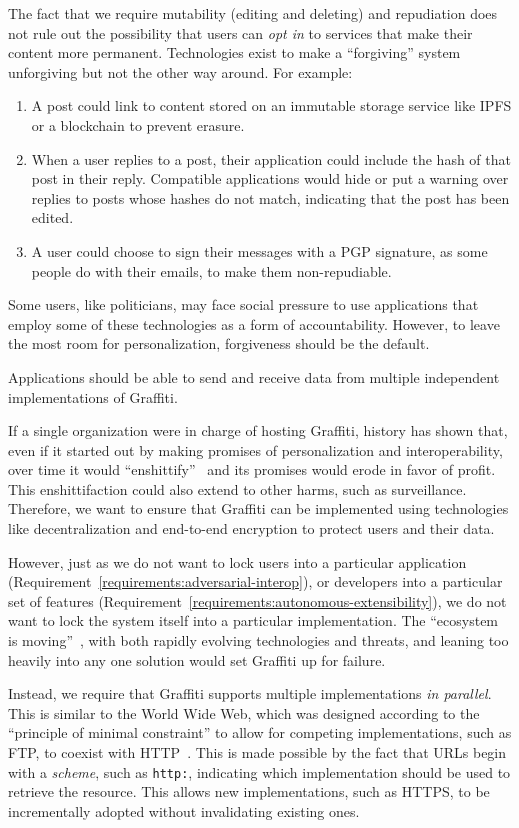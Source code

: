 The fact that we require mutability (editing and deleting) and repudiation does not rule
out the possibility that users can \emph{opt in} to services that make their content more permanent.
Technologies exist to make a ``forgiving'' system unforgiving but not the other way around.
For example:
\begin{enumerate}
\item
A post could link to content stored on an immutable storage service like IPFS
or a blockchain to prevent erasure.
\item
When a user replies to a post, their application could include the hash
of that post in their reply. Compatible applications would
hide or put a warning over replies to posts whose hashes do not match,
indicating that the post has been edited.
\item
A user could choose to sign their messages with a PGP signature,
as some people do with their emails, to make them non-repudiable.
\end{enumerate}
Some users, like politicians, may face social pressure to use applications
that employ some of these technologies as a form of accountability.
However, to leave the most room for personalization, forgiveness should be the default.

\begin{requirement}
\label{requirements:parallel-implementations}
    Applications should be able to send and receive data
    from multiple independent implementations of Graffiti.
\end{requirement}

If a single organization were in charge of hosting Graffiti,
history has shown that, even if it started out by making promises of
personalization and interoperability,
over time it would ``enshittify''~{\cite{enshittification}}
and its promises would erode in favor of profit.
This enshittifaction could also extend to other harms,
such as surveillance.
Therefore, we want to ensure that Graffiti can be implemented using
technologies like decentralization and end-to-end encryption
to protect users and their data.

However, just as we do not want to lock users into a particular application (Requirement~{\ref{requirements:adversarial-interop}}),
or developers into a particular set of features (Requirement~{\ref{requirements:autonomous-extensibility}}),
we do not want to lock the system itself into a particular implementation.
The ``ecosystem is moving''~{\cite{ecosystemmoving}}, with both rapidly evolving
technologies and threats, and
leaning too heavily into any one solution would set Graffiti up for failure.

Instead, we require that Graffiti supports multiple implementations
\emph{in parallel}.
This is similar to the World Wide Web, which was designed according to the
``principle of minimal constraint'' to allow for competing implementations,
such as FTP, to coexist with HTTP~{\cite{weavingtheweb}}.
This is made possible by the fact that URLs begin with a \emph{scheme},
such as \texttt{http:}, indicating which implementation should be
used to retrieve the resource.
This allows new implementations, such as HTTPS, to be
incrementally adopted without invalidating existing ones.
